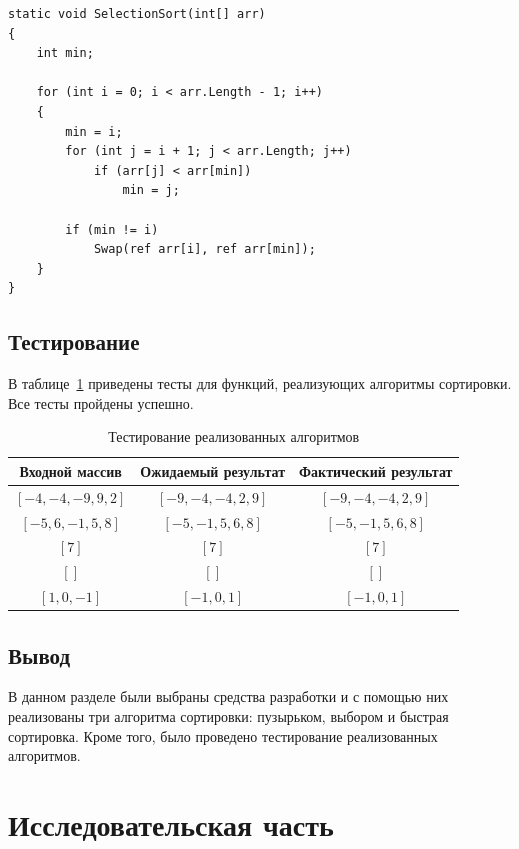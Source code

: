 \documentclass[12pt]{report}
\begin{document}
\begin{lstlisting}[label=some-code,caption=Функция сортировки массива выбором]
static void SelectionSort(int[] arr)
{
	int min;
	
	for (int i = 0; i < arr.Length - 1; i++)
	{
		min = i;
		for (int j = i + 1; j < arr.Length; j++)
			if (arr[j] < arr[min])
				min = j;
		
		if (min != i)
			Swap(ref arr[i], ref arr[min]);
	}
}
\end{lstlisting}
\captionsetup{singlelinecheck = false, justification=centering}
\newpage
\section{Тестирование}

В таблице~\ref{tbl:test} приведены тесты для функций, реализующих алгоритмы сортировки. Все тесты пройдены успешно.

\begin{table}[h!]
	\begin{center}
	\caption{\label{tbl:test}Тестирование реализованных алгоритмов}
		\begin{tabular}{|c|c|c|}
		
			\hline
			Входной массив &  Ожидаемый результат & Фактический результат \\ 
			\hline
			$[-4, -4, -9, 9, 2]$ & $[-9, -4, -4, 2, 9]$  & $[-9, -4, -4, 2, 9]$\\\hline
			$[-5, 6, -1, 5, 8]$  & $[-5, -1, 5, 6, 8]$  & $[-5, -1, 5, 6, 8]$\\\hline
			$[7]$  & $[7]$  & $[7]$\\\hline
			$[]$  & $[]$  & $[]$\\\hline
			$[1, 0, -1]$  & $[-1, 0, 1]$  & $[-1, 0, 1]$\\\hline
		\end{tabular}
		
	\end{center}
\end{table}

\section{Вывод}

В данном разделе были выбраны средства разработки и с помощью них реализованы три алгоритма сортировки: пузырьком, выбором и быстрая сортировка. Кроме того, было проведено тестирование реализованных алгоритмов.

\chapter{Исследовательская часть}
\end{document}
